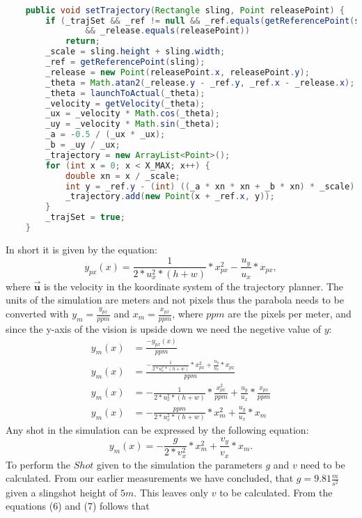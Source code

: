 \documentclass[10pt]{article}
\begin{document}
\begin{lstlisting}[language=Java]

    public void setTrajectory(Rectangle sling, Point releasePoint) {
        if (_trajSet && _ref != null && _ref.equals(getReferencePoint(sling)) && _release != null
                && _release.equals(releasePoint))
            return;
        _scale = sling.height + sling.width;
        _ref = getReferencePoint(sling);
        _release = new Point(releasePoint.x, releasePoint.y);
        _theta = Math.atan2(_release.y - _ref.y, _ref.x - _release.x);
        _theta = launchToActual(_theta);
        _velocity = getVelocity(_theta);
        _ux = _velocity * Math.cos(_theta);
        _uy = _velocity * Math.sin(_theta);
        _a = -0.5 / (_ux * _ux);
        _b = _uy / _ux;
        _trajectory = new ArrayList<Point>();
        for (int x = 0; x < X_MAX; x++) {
            double xn = x / _scale;
            int y = _ref.y - (int) ((_a * xn * xn + _b * xn) * _scale);
            _trajectory.add(new Point(x + _ref.x, y));
        }
        _trajSet = true;
    }
\end{lstlisting}
In short it is given by the equation:
\begin{equation}
y_{px}(x)=\frac{1}{2*u_x^2*(h+w)}*x_{px}^2-\frac{u_y}{u_x}*x_{px},
\end{equation}
where $\boldsymbol{\vec{u}}$ is the velocity in the koordinate system of the trajectory planner. The units of the simulation are meters and not pixels thus the parabola needs to be converted with $y_m=\frac{y_{px}}{ppm}$ and $x_m=\frac{x_{px}}{ppm}$, where $ppm$ are the pixels per meter, and since the y-axis of the vision is upside down we need the negetive value of $y$:
\begin{align}
y_{m}(x)&=\frac{-y_{px}(x)}{ppm}\\
y_{m}(x)&=\frac{-\frac{1}{2*u_x^2*(h+w)}*x_{px}^2+\frac{u_y}{u_x}*x_{px}}{ppm}\\
y_{m}(x)&=-\frac{1}{2*u_x^2*(h+w)}*\frac{x_{px}^2}{ppm}+\frac{u_y}{u_x}*\frac{x_{px}}{ppm}\\
y_{m}(x)&=-\frac{ppm}{2*u_x^2*(h+w)}*x_{m}^2+\frac{u_y}{u_x}*x_{m}
\end{align}
Any shot in the simulation can be expressed by the following equation:
\begin{equation}
y_{m}(x)=-\frac{g}{2*v_x^2}*x_{m}^2+\frac{v_y}{v_x}*x_{m}.
\end{equation}
To perform the $Shot$ given to the simulation the parameters $g$ and $v$ need to be calculated. From our earlier measurements we have concluded, that $g=9.81\frac{m}{s^2}$ given a slingshot height of $5 m$. This leaves only $v$ to be calculated. From the equations (6) and (7) follows that
\end{document}
